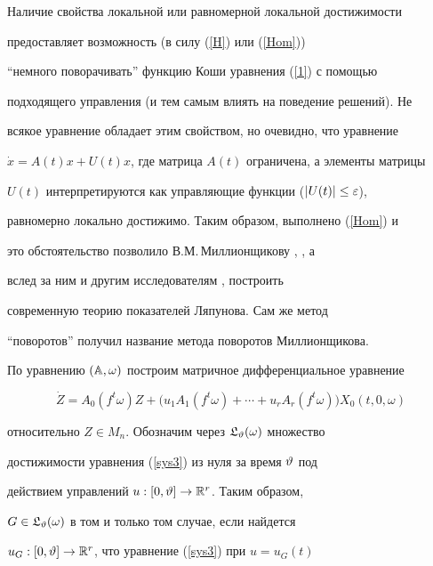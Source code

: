 \begin{note}


\label{rem1}


Наличие свойства локальной или равномерной локальной достижимости


предоставляет возможность (в силу (\ref{H}) или (\ref{Hom}))


``немного поворачивать'' функцию Коши уравнения (\ref{1}) с помощью


подходящего управления (и тем самым влиять на поведение решений). Не


всякое уравнение обладает этим свойством, но очевидно, что уравнение


$\Dot x=A(t)x+U(t)x$, где матрица $A(t)$ ограничена, а элементы матрицы


$U(t)$ интерпретируются как управляющие функции ($|U(t)|\le\varepsilon$),


равномерно локально достижимо. Таким образом, выполнено  (\ref{Hom}) и


это обстоятельство позволило В.М.\,Миллионщикову \cite{M69S}, \cite{M69D}, а


вслед за ним и другим исследователям \cite{Izob}, построить


современную теорию показателей Ляпунова. Сам же метод


``поворотов'' получил название метода поворотов Миллионщикова.


\end{note}





По уравнению $(\Bbb A,\omega)$ построим матричное дифференциальное уравнение


\begin{equation}


\label{sys3}


\Dot Z=A_0(f^t\omega)Z+


\big(u_1A_1(f^t\omega)+\dotsb+u_rA_r(f^t\omega)\big)X_0(t,0,\omega)


\end{equation}


относительно $Z\in M_n$. Обозначим через $\frak L_{\vartheta}(\omega)$ множество


достижимости уравнения (\ref{sys3}) из нуля за время $\vartheta$ под


действием управлений $u:[0,\vartheta]\to\Bbb R^r$. Таким образом,


$G\in\frak L_{\vartheta}(\omega)$ в том и только том случае, если найдется


$u_G:[0,\vartheta]\to\Bbb R^r$, что уравнение (\ref{sys3}) при $u=u_G(t)$



